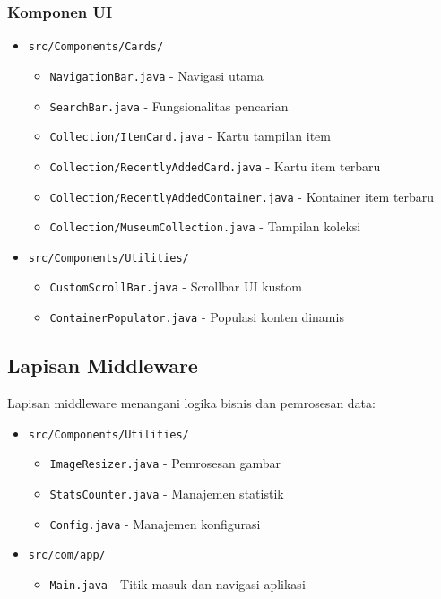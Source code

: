 \documentclass[12pt,a4paper]{article}
\begin{document}
\subsubsection{Komponen UI}
\begin{itemize}
    \item \texttt{src/Components/Cards/}
    \begin{itemize}
        \item \texttt{NavigationBar.java} - Navigasi utama
        \item \texttt{SearchBar.java} - Fungsionalitas pencarian
        \item \texttt{Collection/ItemCard.java} - Kartu tampilan item
        \item \texttt{Collection/RecentlyAddedCard.java} - Kartu item terbaru
        \item \texttt{Collection/RecentlyAddedContainer.java} - Kontainer item terbaru
        \item \texttt{Collection/MuseumCollection.java} - Tampilan koleksi
    \end{itemize}
    
    \item \texttt{src/Components/Utilities/}
    \begin{itemize}
        \item \texttt{CustomScrollBar.java} - Scrollbar UI kustom
        \item \texttt{ContainerPopulator.java} - Populasi konten dinamis
    \end{itemize}
\end{itemize}

\subsection{Lapisan Middleware}
Lapisan middleware menangani logika bisnis dan pemrosesan data:

\begin{itemize}
    \item \texttt{src/Components/Utilities/}
    \begin{itemize}
        \item \texttt{ImageResizer.java} - Pemrosesan gambar
        \item \texttt{StatsCounter.java} - Manajemen statistik
        \item \texttt{Config.java} - Manajemen konfigurasi
    \end{itemize}
    
    \item \texttt{src/com/app/}
    \begin{itemize}
        \item \texttt{Main.java} - Titik masuk dan navigasi aplikasi
    \end{itemize}
\end{itemize}
\end{document}
